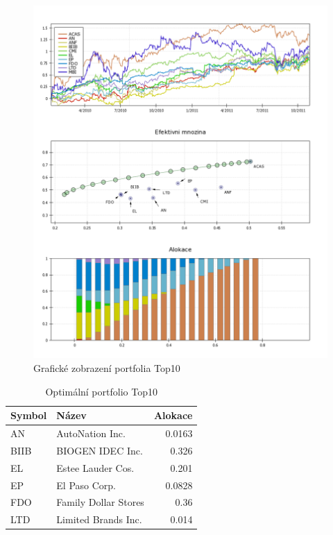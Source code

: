 \documentclass[a4paper,12pt]{report}
\begin{document}
    \begin{figure}[htb]
      \centering
        \includegraphics[height=0.95\textheight]{top10.png}
       \caption{Grafické zobrazení portfolia Top10}
    \end{figure}

    \begin{table}[htb]
      \centering
      \begin{tabular}{|l|l|r|}
        \hline
        Symbol&Název&Alokace\\\hline\hline
        AN&AutoNation Inc. &0.0163\\\hline
        BIIB&BIOGEN IDEC Inc. &0.326\\\hline
        EL&Estee Lauder Cos. &0.201\\\hline
        EP&El Paso Corp. &0.0828\\\hline
        FDO&Family Dollar Stores &0.36\\\hline
        LTD&Limited Brands Inc. &0.014\\\hline

      \end{tabular}
      \caption{Optimální portfolio Top10}
    \end{table}
\end{document}
